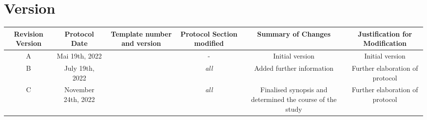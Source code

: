 \section{Version}
\begin{tabularx}{1\textwidth}{@{}C *{5}{C}@{}}
\toprule
\textbf{Revision Version} & \textbf{Protocol Date} & \textbf{Template number and version} & \textbf{Protocol Section modified} & \textbf{Summary of Changes} & \textbf{Justification for Modification}\\
\midrule
A & Mai 19th, 2022 &  & - & Initial version & Initial version \\
B & July 19th, 2022 &  & \textit{all} & Added further information & Further elaboration of protocol\\
C & November 24th, 2022 &  & \textit{all} & Finalised synopsis and determined the course of the study & Further elaboration of protocol\\
\bottomrule
\end{tabularx}


